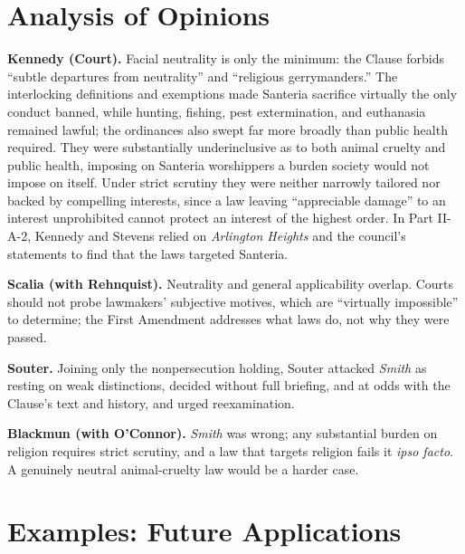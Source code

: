 \documentclass[12pt]{article}
\begin{document}
\section{Analysis of Opinions}

\textbf{Kennedy (Court).} Facial neutrality is only the minimum: the Clause forbids ``subtle departures from neutrality'' and ``religious gerrymanders.'' The interlocking definitions and exemptions made Santeria sacrifice virtually the only conduct banned, while hunting, fishing, pest extermination, and euthanasia remained lawful; the ordinances also swept far more broadly than public health required. They were substantially underinclusive as to both animal cruelty and public health, imposing on Santeria worshippers a burden society would not impose on itself. Under strict scrutiny they were neither narrowly tailored nor backed by compelling interests, since a law leaving ``appreciable damage'' to an interest unprohibited cannot protect an interest of the highest order. In Part II-A-2, Kennedy and Stevens relied on \textit{Arlington Heights} and the council's statements to find that the laws targeted Santeria.

\textbf{Scalia (with Rehnquist).} Neutrality and general applicability overlap. Courts should not probe lawmakers' subjective motives, which are ``virtually impossible'' to determine; the First Amendment addresses what laws do, not why they were passed.

\textbf{Souter.} Joining only the nonpersecution holding, Souter attacked \textit{Smith} as resting on weak distinctions, decided without full briefing, and at odds with the Clause's text and history, and urged reexamination.

\textbf{Blackmun (with O'Connor).} \textit{Smith} was wrong; any substantial burden on religion requires strict scrutiny, and a law that targets religion fails it \textit{ipso facto}. A genuinely neutral animal-cruelty law would be a harder case.

\section{Examples: Future Applications}
\end{document}
